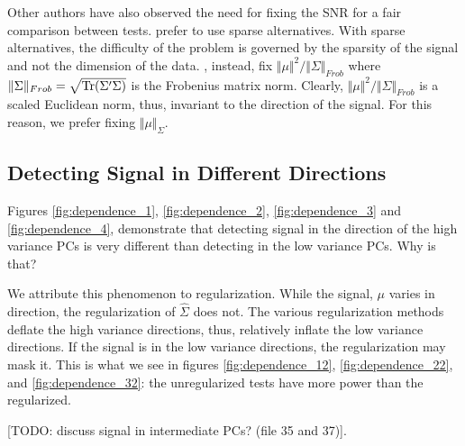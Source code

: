 \documentclass[journal]{IEEEtran}
\begin{document}
Other authors have also observed the need for fixing the SNR for a fair comparison between tests.
\cite{ramdas2015decreasing} prefer to use sparse alternatives. 
With sparse alternatives, the difficulty of the problem is governed by the sparsity of the signal and not the dimension of the data. 
\cite{chen2010two}, instead, fix $\Vert \mu \Vert^2/\Vert \Sigma \Vert_{Frob}$ where $\Vert \Sigma \Vert_{Frob}=\sqrt{\operatorname{Tr}(\Sigma'\Sigma)}$ is the Frobenius matrix norm. 
Clearly, $\Vert \mu \Vert^2/\Vert \Sigma \Vert_{Frob}$ is a scaled Euclidean norm, thus, invariant to the direction of the signal. 
For this reason, we prefer fixing $\Vert \mu \Vert_\Sigma$.






\subsection{Detecting Signal in Different Directions}
Figures \ref{fig:dependence_1}, \ref{fig:dependence_2}, \ref{fig:dependence_3} and \ref{fig:dependence_4}, demonstrate that detecting signal in the direction of the high variance PCs is very different than detecting in the low variance PCs.
Why is that?

We attribute this phenomenon to regularization.
While the signal, $\mu$ varies in direction, the regularization of $\hat \Sigma$ does not. 
The various regularization methods deflate the high variance directions, thus, relatively inflate the low variance directions.
If the signal is in the low variance directions, the regularization may mask it. 
This is what we see in figures \ref{fig:dependence_12}, \ref{fig:dependence_22}, and \ref{fig:dependence_32}: the unregularized tests have more power than the regularized. 

[TODO: discuss signal in intermediate PCs? (file 35 and 37)].
\end{document}
